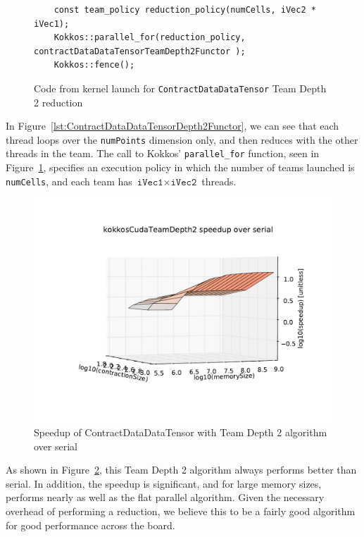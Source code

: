\begin{figure}[ht]
    \begin{lstlisting}
    const team_policy reduction_policy(numCells, iVec2 * iVec1);
    Kokkos::parallel_for(reduction_policy, contractDataDataTensorTeamDepth2Functor );
    Kokkos::fence();
 \end{lstlisting}
\caption{Code from kernel launch for \texttt{ContractDataDataTensor} Team Depth
2 reduction
\label{lst:ContractDataDataTensorDepth2Call}} 
\end{figure}

In Figure~\ref{lst:ContractDataDataTensorDepth2Functor}, we can see that each
thread loops over the \texttt{numPoints} dimension only, and then
reduces with the other threads in the team.  The call to Kokkos'
\texttt{parallel\_for} function, seen in
Figure~\ref{lst:ContractDataDataTensorDepth2Call}, specifies an execution policy
in which the number of teams launched is \texttt{numCells}, and each team has
$\texttt{iVec1}\times\texttt{iVec2}$ threads.

\begin{figure}[ht]
    \includegraphics[scale=.55]{./VersusSerial_kokkosCudaTeamDepth2_clearCache_shadowfax.pdf}
\caption{Speedup of ContractDataDataTensor with Team Depth 2 algorithm over
    serial
\label{fig:ContractDataDataTensorDepth2}} 
\end{figure}

As shown in Figure~\ref{fig:ContractDataDataTensorDepth2}, this Team Depth 2
algorithm always performs better than serial.  In addition, the speedup is
significant, and for large memory sizes, performs nearly as well as the flat
parallel algorithm.  Given the necessary overhead of performing a reduction, we
believe this to be a fairly good algorithm for good performance across the
board.

